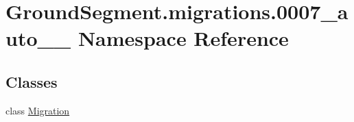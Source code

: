 \hypertarget{namespace_ground_segment_1_1migrations_1_10007__auto__20161126__1841}{}\section{Ground\+Segment.\+migrations.0007\+\_\+auto\+\_\+\_ Namespace Reference}
\label{namespace_ground_segment_1_1migrations_1_10007__auto__20161126__1841}
\subsection*{Classes}
\begin{DoxyCompactItemize}
\item 
class \hyperlink{class_ground_segment_1_1migrations_1_10007__auto__20161126__1841_1_1_migration}{Migration}
\end{DoxyCompactItemize}
